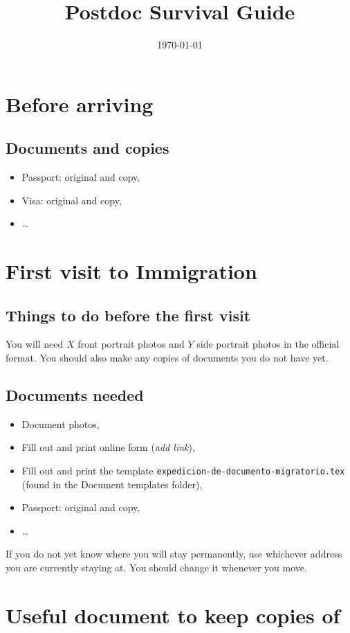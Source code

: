 \documentclass{article}
\title{Postdoc Survival Guide}
\author{}
\date{\today}
\begin{document}
\maketitle

\section{Before arriving}

\subsection{Documents and copies}

\begin{itemize}
\item Passport: original and copy,
\item Visa: original and copy,
\item \ldots
\end{itemize}

\section{First visit to Immigration}

\subsection{Things to do before the first visit}

You will need $X$ front portrait photos and $Y$ side portrait photos in the official format. You should also make any copies of documents you do not have yet.

\subsection{Documents needed}

\begin{itemize}
\item Document photos,
\item Fill out and print online form (\emph{add link}),
\item Fill out and print the template \texttt{expedicion-de-documento-migratorio.tex} (found in the Document templates folder),
\item Passport: original and copy,
\item \ldots
\end{itemize}

If you do not yet know where you will stay permanently, use whichever address you are currently staying at.  You should change it whenever you move.

\section{Useful document to keep copies of}
\end{document}
